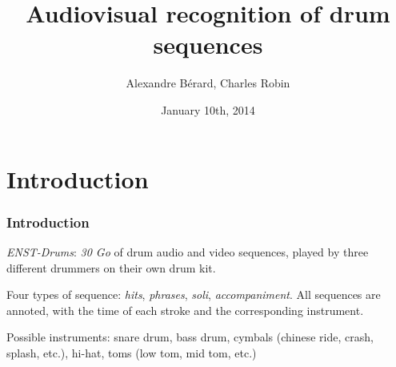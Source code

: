 \documentclass{beamer}
\title[Audiovisual recognition of drum sequences]{Audiovisual recognition of drum sequences}
\author[A.~Bérard, C.~Robin]{Alexandre Bérard, Charles Robin}
\date{January 10th, 2014}
\begin{document}
    \begin{frame}
    \titlepage
    \end{frame}

    \section{Introduction}    
    \begin{frame}
        \frametitle{Introduction}
        \emph{ENST-Drums}: \emph{30 Go} of drum audio and video sequences, played by three different drummers on their own drum kit.
        \vspace*{0.5cm}
       
        Four types of sequence: \emph{hits}, \emph{phrases}, \emph{soli}, \emph{accompaniment}. All sequences are annoted, with the time of each stroke and the corresponding instrument.
        \vspace*{0.5cm}

        Possible instruments: snare drum, bass drum, cymbals (chinese ride, crash, splash, etc.), hi-hat, toms (low tom, mid tom, etc.)
    \end{frame}
\end{document}
